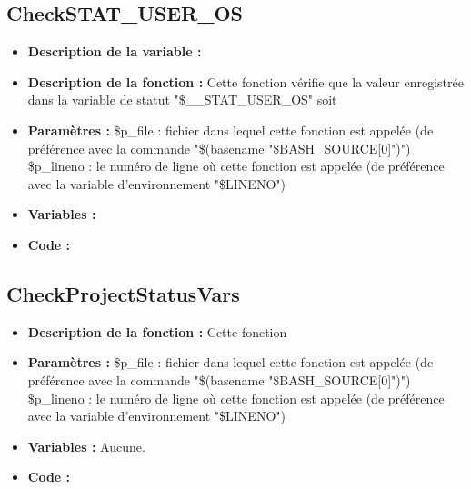 \documentclass[a4paper,10pt]{article}
\begin{document}
\subsection{CheckSTAT\_USER\_OS}
\begin{itemize}
    \item \textbf{Description de la variable :}

    \item \textbf{Description de la fonction :} Cette fonction vérifie que la valeur enregistrée dans la variable de statut "\$\_\_STAT\_USER\_OS" soit

    \item \textbf{Paramètres :} \$p\_file : fichier dans lequel cette fonction est appelée (de préférence avec la commande "\$(basename "\$BASH\_SOURCE[0]")")
    \$p\_lineno : le numéro de ligne où cette fonction est appelée (de préférence avec la variable d'environnement "\$LINENO")

    \item \textbf{Variables :}

    \item \textbf{Code :}
\end{itemize}

\subsection{CheckProjectStatusVars}
\begin{itemize}
    \item \textbf{Description de la fonction :} Cette fonction

    \item \textbf{Paramètres :} \$p\_file : fichier dans lequel cette fonction est appelée (de préférence avec la commande "\$(basename "\$BASH\_SOURCE[0]")")
    \$p\_lineno : le numéro de ligne où cette fonction est appelée (de préférence avec la variable d'environnement "\$LINENO")

    \item \textbf{Variables :} Aucune.

    \item \textbf{Code :}
\end{itemize}
\end{document}
